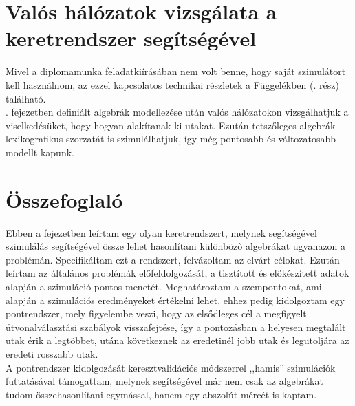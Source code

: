   \section{Valós hálózatok vizsgálata a keretrendszer segítségével}\label{section_real}
  Mivel a diplomamunka feladatkiírásában nem volt benne, hogy saját szimulátort kell használnom, az ezzel kapcsolatos technikai részletek a Függelékben (. rész) található.\\

  . fejezetben definiált algebrák modellezése után valós hálózatokon vizsgálhatjuk a viselkedésüket, hogy hogyan alakítanak ki utakat. Ezután tetszőleges algebrák lexikografikus szorzatát is szimulálhatjuk, így még pontosabb és változatosabb modellt kapunk.


  \section{Összefoglaló}
  Ebben a fejezetben leírtam egy olyan keretrendszert, melynek segítségével szimulálás segítségével össze lehet hasonlítani különböző algebrákat ugyanazon a problémán. Specifikáltam ezt a rendszert, felvázoltam az elvárt célokat. Ezután leírtam az általános problémák előfeldolgozását, a tisztított és előkészített adatok alapján a szimuláció pontos menetét. Meghatároztam a szempontokat, ami alapján a szimulációs eredményeket értékelni lehet, ehhez pedig kidolgoztam egy pontrendszer, mely figyelembe veszi, hogy az elsődleges cél a megfigyelt útvonalválasztási szabályok visszafejtése, így a pontozásban a helyesen megtalált utak érik a legtöbbet, utána következnek az eredetinél jobb utak és legutoljára az eredeti rosszabb utak.\\
  A pontrendszer kidolgozását keresztvalidációs módszerrel ,,hamis'' szimulációk futtatásával támogattam, melynek segítségével már nem csak az algebrákat tudom összehasonlítani egymással, hanem egy abszolút mércét is kaptam.